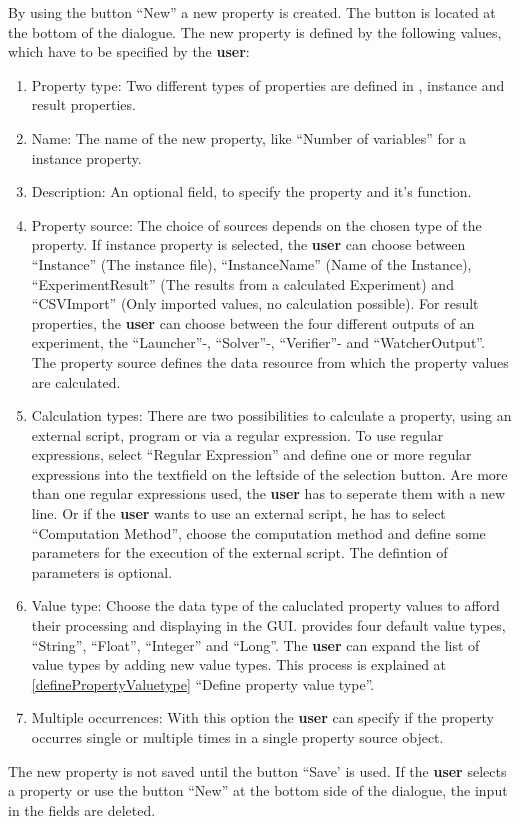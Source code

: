 By using the button ``New'' a new property is created. The button is located at the bottom of the dialogue. The new property  is defined by the following values, which have to be specified by the \textbf{user}:
\begin{enumerate}
	\item Property type: Two different types of properties are defined in \edacc, instance and result properties. 
	\item Name: The name of the new property, like ``Number of variables'' for a instance property.
	\item Description: An optional field, to specify the property and it's function.
	\item Property source: The choice of sources depends on the chosen type of the property. If instance property is selected, the \textbf{user} can choose between ``Instance'' (The instance file), ``InstanceName'' (Name of the Instance), ``ExperimentResult'' (The results from a calculated Experiment) and ``CSVImport'' (Only imported values, no calculation possible). For result properties, the \textbf{user} can choose between the four different outputs of an experiment, the ``Launcher''-, ``Solver''-, ``Verifier''- and ``WatcherOutput''. The property source defines the data resource from which the property values are calculated. 
	\item Calculation types: There are two possibilities to calculate a property, using an external script, program or via a regular expression. To use regular expressions, select ``Regular Expression'' and define one or more regular expressions into the textfield on the leftside of the selection button. Are more than one regular expressions used, the \textbf{user} has to seperate them with a new line. Or if the \textbf{user} wants to use an external script, he has to select ``Computation Method'', choose the computation method and define some parameters for the execution of the external script. \attention The defintion of parameters is optional.
	\item Value type: Choose the data type of the caluclated property values to afford their processing and displaying in the GUI. \edacc provides four default value types, ``String'', ``Float'', ``Integer'' and ``Long''. The \textbf{user} can expand the list of value types by adding new value types. This process is  explained at \ref{definePropertyValuetype} ``Define property value type''. 
	\item Multiple occurrences: With this option the \textbf{user} can specify if the property occurres single or multiple times in a single property source object. 
\end{enumerate} 
\attention The new property is not saved until the button ``Save' is used. If the \textbf{user} selects a property or use the button ``New'' at the bottom side of the dialogue, the input in the fields are deleted. 

